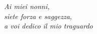 \hfill
\begin{minipage}[t]{0.47\textwidth}\raggedleft
    \vspace{30mm}
	{{\large}{\emph{Ai miei nonni,\\
    siete forza e saggezza,\\
    a voi dedico il mio traguardo}}{\normalsize\vspace{3mm}}}
\end{minipage}
